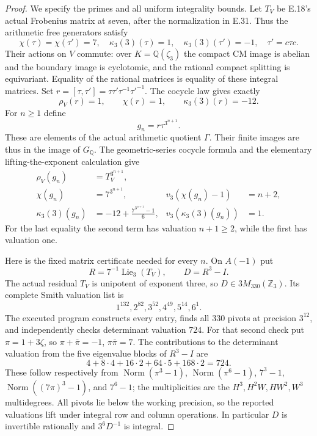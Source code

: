 \begin{proof}
We specify the primes and all uniform
integrality bounds. Let $T_V$ be E.18's
actual Frobenius matrix at seven, after
the normalization in E.31. Thus the
arithmetic free generators satisfy
\[
 \chi(\tau)=\chi(\tau')=7,
 \quad \kappa_3(3)(\tau)=1,
 \quad \kappa_3(3)(\tau')=-1,
 \quad \tau'=c\tau c.
 \tag{E.38.3}
\]
Their actions on $V$ commute: over
$K=\mathbb Q(\zeta_3)$ the compact CM
image is abelian and the boundary image
is cyclotomic, and the rational compact
splitting is equivariant. Equality of
the rational matrices is equality of
these integral matrices. Set
$r=[\tau,\tau']=\tau\tau'\tau^{-1}\tau'^{-1}$.
The cocycle law gives exactly
\[
           \rho_V(r)=1,\qquad
           \chi(r)=1,\qquad
           \kappa_3(3)(r)=-12.
 \tag{E.38.4}
\]
For $n\ge1$ define
\[
                  g_n=r\tau^{3^{n+1}}.
 \tag{E.38.5}
\]
These are elements of the actual
arithmetic quotient $\Gamma$.
Their finite images are thus in the
image of $G_{\mathbb Q}$.
The geometric-series cocycle formula
and the elementary lifting-the-exponent
calculation give
\[
 \begin{aligned}
 \rho_V(g_n)&=T_V^{3^{n+1}},\\
 \chi(g_n)&=7^{3^{n+1}},
       &v_3(\chi(g_n)-1)&=n+2,\\
 \kappa_3(3)(g_n)&=-12+
       \frac{7^{3^{n+1}}-1}{6},
       &v_3(\kappa_3(3)(g_n))&=1.
 \end{aligned}
 \tag{E.38.6}
\]
For the last equality the second term
has valuation $n+1\ge2$, while the
first has valuation one.

Here is the fixed matrix certificate
needed for every $n$. On $A(-1)$ put
\[
 R=7^{-1}\operatorname{Lie}_3(T_V),
       \qquad D=R^3-I.
\]
The actual residual $T_V$ is unipotent
of exponent three, so $D\in3M_{330}(\mathbb Z_3)$.
Its complete Smith valuation list is
\[
                 1^{132},2^{82},3^{52},
                       4^{49},5^{14},6^1.
 \tag{E.38.7}
\]
The executed program constructs every
entry, finds all $330$ pivots at
precision $3^{12}$, and independently
checks determinant valuation $724$.
For that second check put
$\pi=1+3\zeta$, so
$\pi+\bar\pi=-1$, $\pi\bar\pi=7$.
The contributions to the determinant
valuation from the five eigenvalue
blocks of $R^3-I$ are
\[
                  4+8\cdot4+16\cdot2
                       +64\cdot5+168\cdot2=724.
\]
These follow respectively from
$\operatorname{Norm}(\pi^3-1)$,
$\operatorname{Norm}(\pi^6-1)$,
$7^3-1$, $\operatorname{Norm}((7\pi)^3-1)$,
and $7^6-1$; the multiplicities are
the $H^3,H^2W,HW^2,W^3$ multidegrees.
All pivots lie below the working
precision, so the reported valuations
lift under integral row and column
operations. In particular $D$ is
invertible rationally and $3^6D^{-1}$
is integral.


\end{proof}
